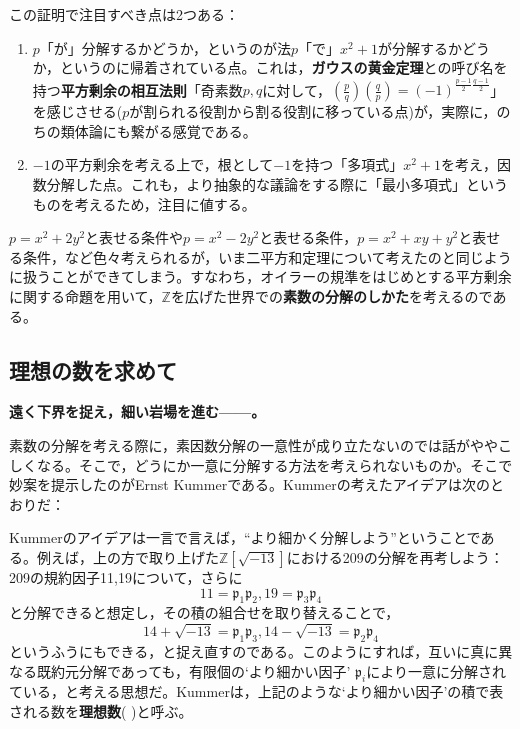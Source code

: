 この証明で注目すべき点は2つある：

\begin{enumerate}
    \item $p$「が」分解するかどうか，というのが法$p$「で」$x^2+1$が分解するかどうか，というのに帰着されている点。これは，\textbf{ガウスの黄金定理}との呼び名を持つ\textbf{平方剰余の相互法則}「奇素数$p, q$に対して，$\left(\frac{p}{q}\right)\left(\frac{q}{p}\right)=(-1)^{\frac{p-1}{2}\frac{q-1}{2}}$」を感じさせる($p$が割られる役割から割る役割に移っている点)が，実際に，のちの類体論にも繋がる感覚である。
    \item $-1$の平方剰余を考える上で，根として$-1$を持つ「多項式」$x^2+1$を考え，因数分解した点。これも，より抽象的な議論をする際に「最小多項式」というものを考えるため，注目に値する。
\end{enumerate}

$p=x^2+2y^2$と表せる条件や$p=x^2-2y^2$と表せる条件，$p=x^2+xy+y^2$と表せる条件，など色々考えられるが，いま二平方和定理について考えたのと同じように扱うことができてしまう。すなわち，オイラーの規準をはじめとする平方剰余に関する命題を用いて，$\mathbb{Z}$を広げた世界での\textbf{素数の分解のしかた}を考えるのである。

\subsection{理想の数を求めて}
\textbf{遠く下界を捉え，細い岩場を進む------。}

\vspace{10pt}

素数の分解を考える際に，素因数分解の一意性が成り立たないのでは話がややこしくなる。そこで，どうにか一意に分解する方法を考えられないものか。そこで妙案を提示したのがErnst Kummerである。Kummerの考えたアイデアは次のとおりだ：

\begin{mybox}[クンマーのIdea]
    Kummerのアイデアは一言で言えば，``より細かく分解しよう''ということである。例えば，上の方で取り上げた$\mathbb{Z}[\sqrt{-13}]$における209の分解を再考しよう：209の規約因子11,19について，さらに\[
    11=\mathfrak{p}_1\mathfrak{p}_2, 19=\mathfrak{p}_3\mathfrak{p}_4
    \]と分解できると想定し，その積の組合せを取り替えることで，\[
    14+\sqrt{-13}=\mathfrak{p}_1\mathfrak{p}_3, 14-\sqrt{-13}=\mathfrak{p}_2\mathfrak{p}_4
    \]というふうにもできる，と捉え直すのである。このようにすれば，互いに真に異なる既約元分解であっても，有限個の`より細かい因子' $\mathfrak{p}_i$により一意に分解されている，と考える思想だ。Kummerは，上記のような`より細かい因子'の積で表される数を\textbf{理想数}( )と呼ぶ。
\end{mybox}

